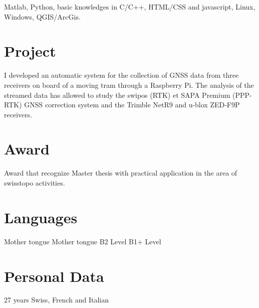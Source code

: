 \documentclass[]{curriculum}
\begin{document}
              {Matlab, Python, basic knowledges in C/C++, HTML/CSS and javascript, Linux, Windows, QGIS/ArcGis.}

  \section{Project}

              {I developed an automatic system for the collection of GNSS data from three receivers on board of a moving tram through a Raspberry Pi. The analysis of the streamed data has allowed to study the swipos (RTK) et SAPA Premium (PPP-RTK) GNSS correction system and the Trimble NetR9 and u-blox ZED-F9P receivers.}

  \section{Award}
        {Award that recognize Master thesis with practical application in the area of swisstopo activities.}


  \AddTopMargin
  \section{Languages}

          {Mother tongue}
          {Mother tongue}
          {B2 Level}
          {B1+ Level}


  \section{Personal Data}

                {27 years}
                {Swiss, French and Italian}
\end{document}
